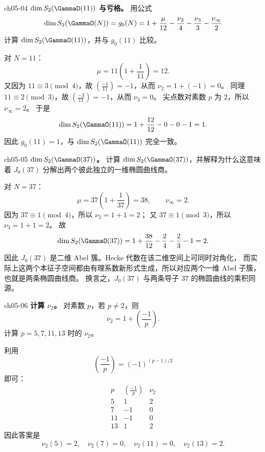 \begin{problem}{ch05-04}
\textbf{$\dim S_2(\GammaO(11))$ 与亏格。}
用公式
\[
\dim S_2(\GammaO(N))=g_0(N)=1+\frac{\mu}{12}-\frac{\nu_2}{4}-\frac{\nu_3}{3}-\frac{\nu_\infty}{2}
\]
计算 $\dim S_2(\GammaO(11))$，并与 $g_0(11)$ 比较。
\end{problem}
\begin{solution}
对 $N=11$：
\[
\mu=11\left(1+\frac1{11}\right)=12.
\]
又因为 $11\equiv 3\pmod4$，故 $\left(\frac{-1}{11}\right)=-1$，从而 $\nu_2=1+(-1)=0$。
同理 $11\equiv 2\pmod3$，故 $\left(\frac{-3}{11}\right)=-1$，从而 $\nu_3=0$。
尖点数对素数 $p$ 为 $2$，所以 $\nu_\infty=2$。
于是
\[
\dim S_2(\GammaO(11))=1+\frac{12}{12}-0-0-1=1.
\]
因此 $g_0(11)=1$，与 $\dim S_2(\GammaO(11))$ 完全一致。
\end{solution}

\begin{problem}{ch05-05}
\textbf{$\dim S_2(\GammaO(37))$。}
计算 $\dim S_2(\GammaO(37))$，并解释为什么这意味着 $J_0(37)$ 分解出两个彼此独立的一维椭圆曲线商。
\end{problem}
\begin{solution}
对 $N=37$：
\[
\mu=37\left(1+\frac1{37}\right)=38,
\qquad \nu_\infty=2.
\]
因为 $37\equiv 1\pmod4$，所以 $\nu_2=1+1=2$；
又 $37\equiv 1\pmod3$，所以 $\nu_3=1+1=2$。
故
\[
\dim S_2(\GammaO(37))=1+\frac{38}{12}-\frac24-\frac23-1=2.
\]
因此 $J_0(37)$ 是二维 Abel 簇。Hecke 代数在该二维空间上可同时对角化，
而实际上这两个本征子空间都由有理系数新形式生成，所以对应两个一维 Abel 子簇，也就是两条椭圆曲线商。
换言之，$J_0(37)$ 与两条导子 $37$ 的椭圆曲线的乘积同源。
\end{solution}

\begin{problem}{ch05-06}
\textbf{计算 $\nu_2$。}
对素数 $p$，若 $p\neq 2$，则
\[
\nu_2=1+\left(\frac{-1}{p}\right).
\]
计算 $p=5,7,11,13$ 时的 $\nu_2$。
\end{problem}
\begin{solution}
利用
\[
\left(\frac{-1}{p}\right)=(-1)^{(p-1)/2}
\]
即可：
\[
\begin{array}{c|c|c}
p & \left(\frac{-1}{p}\right) & \nu_2 \\ \hline
5 & 1 & 2 \\
7 & -1 & 0 \\
11 & -1 & 0 \\
13 & 1 & 2
\end{array}
\]
因此答案是
\[
\nu_2(5)=2,\quad \nu_2(7)=0,\quad \nu_2(11)=0,\quad \nu_2(13)=2.
\]
\end{solution}

